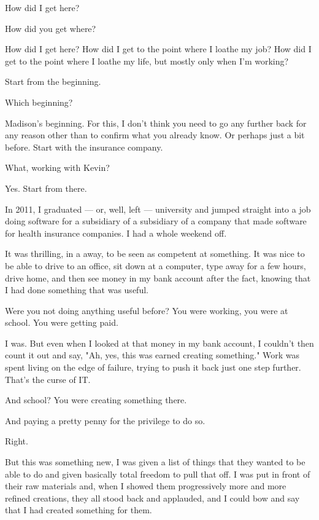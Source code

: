 \label{burnout}
\begin{paracol}{2}
  \begin{leftcolumn}
\noindent How did I get here?

\begin{ally}
How did you get where?
\end{ally}
How did I get here? How did I get to the point where I loathe my job? How did I get to the point where I loathe my life, but mostly only when I'm working?

\begin{ally}
Start from the beginning.
\end{ally}
Which beginning?

\begin{ally}
Madison's beginning. For this, I don't think you need to go any further back for any reason other than to confirm what you already know. Or perhaps just a bit before. Start with the insurance company.
\end{ally}
What, working with Kevin?

\begin{ally}
Yes. Start from there.
\end{ally}
In 2011, I graduated --- or, well, left --- university and jumped straight into a job doing software for a subsidiary of a subsidiary of a company that made software for health insurance companies. I had a whole weekend off.

It was thrilling, in a away, to be seen as competent at something. It was nice to be able to drive to an office, sit down at a computer, type away for a few hours, drive home, and then see money in my bank account after the fact, knowing that I had done something that was useful.

\begin{ally}
Were you not doing anything useful before? You were working, you were at school. You were getting paid.
\end{ally}
I was. But even when I looked at that money in my bank account, I couldn't then count it out and say, "Ah, yes, this was earned creating something." Work was spent living on the edge of failure, trying to push it back just one step further. That's the curse of IT.

\begin{ally}
And school? You were creating something there.
\end{ally}
And paying a pretty penny for the privilege to do so.

\begin{ally}
Right.
\end{ally}
But this was something new, I was given a list of things that they wanted to be able to do and given basically total freedom to pull that off. I was put in front of their raw materials and, when I showed them progressively more and more refined creations, they all stood back and applauded, and I could bow and say that I had created something for them.


\end{leftcolumn}
\end{paracol}
